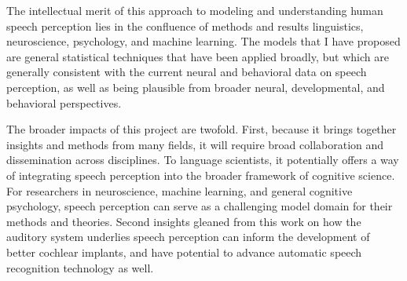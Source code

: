 \documentclass[12pt]{article}
\begin{document}
The intellectual merit of this approach to modeling and understanding human speech perception lies in the confluence of methods and results linguistics, neuroscience, psychology, and machine learning.  The models that I have proposed are general statistical techniques that have been applied broadly, but which are generally consistent with the current neural and behavioral data on speech perception, as well as being plausible from broader neural, developmental, and behavioral perspectives.

The broader impacts of this project are twofold.  First, because it brings together insights and methods from many fields, it will require broad collaboration and dissemination across disciplines.  To language scientists, it potentially offers a way of integrating speech perception into the broader framework of cognitive science.  For researchers in neuroscience, machine learning, and general cognitive psychology, speech perception can serve as a challenging model domain for their methods and theories.  Second insights gleaned from this work on how the auditory system underlies speech perception can inform the development of better cochlear implants, and have potential to advance automatic speech recognition technology as well. 


%

{
\fontsize{10}{10}
\selectfont

}
\end{document}
